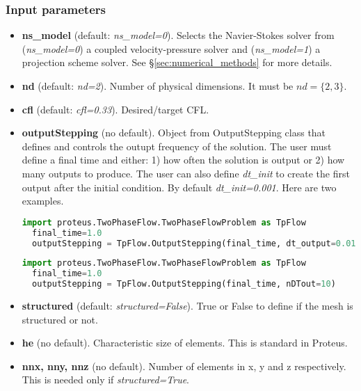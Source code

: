 \documentclass[english,11pt]{article}
\begin{document}
\subsubsection{Input parameters}
\begin{itemize}
\item {\bf ns\_model} (default: {\it ns\_model=0}).
  Selects the Navier-Stokes solver from
  ({\it ns\_model=0}) a coupled velocity-pressure solver and
  ({\it ns\_model=1}) a projection scheme solver. See \S\ref{sec:numerical_methods}
  for more details. 

\item {\bf nd} (default: {\it nd=2}).
  Number of physical dimensions. It must be $nd=\{2,3\}$. 

\item {\bf cfl} (default: {\it cfl=0.33}).
  Desired/target CFL.

\item {\bf outputStepping} (no default).
  Object from OutputStepping class that defines and controls the outupt frequency of the solution.
  The user must define a final time and either: 1) how often the solution is output or 2) how many
  outputs to produce. 
  The user can also define {\it dt\_init} to create the first output after the initial condition.
  By default {\it dt\_init=0.001}. 
  Here are two examples.
  
\begin{lstlisting}[language=python, frame=single]
  import proteus.TwoPhaseFlow.TwoPhaseFlowProblem as TpFlow
  final_time=1.0
  outputStepping = TpFlow.OutputStepping(final_time, dt_output=0.01)  
\end{lstlisting}  

\begin{lstlisting}[language=python, frame=single]
  import proteus.TwoPhaseFlow.TwoPhaseFlowProblem as TpFlow
  final_time=1.0
  outputStepping = TpFlow.OutputStepping(final_time, nDTout=10)
\end{lstlisting}  

\item {\bf structured} (default: {\it structured=False}).
  True or False to define if the mesh is structured or not. 

\item {\bf he} (no default).
  Characteristic size of elements. This is standard in Proteus.

\item {\bf nnx, nny, nnz} (no default).
  Number of elements in x, y and z respectively. This is needed only if {\it structured=True}.


\end{itemize}
\end{document}
